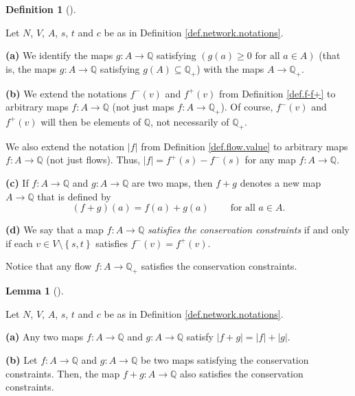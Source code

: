 \documentclass[numbers=enddot,12pt,final,onecolumn,notitlepage]{scrartcl}%
\theoremstyle{definition}
\newtheorem{lem}[theo]{Lemma}
\newenvironment{lemma}[1][]
{\begin{lem}[#1]\begin{leftbar}}
{\end{leftbar}\end{lem}}
\newtheorem{defi}[theo]{Definition}
\newenvironment{definition}[1][]
{\begin{defi}[#1]\begin{leftbar}}
{\end{leftbar}\end{defi}}
\begin{document}
\begin{definition}
Let $N$, $V$, $A$, $s$, $t$ and $c$ be as in Definition
\ref{def.network.notations}.

\textbf{(a)} We identify the maps $g:A\rightarrow\mathbb{Q}$ satisfying
$\left(  g\left(  a\right)  \geq0\text{ for all }a\in A\right)  $ (that is,
the maps $g:A\rightarrow\mathbb{Q}$ satisfying $g\left(  A\right)
\subseteq\mathbb{Q}_{+}$) with the maps $A\rightarrow\mathbb{Q}_{+}$.

\textbf{(b)} We extend the notations $f^{-}\left(  v\right)  $ and
$f^{+}\left(  v\right)  $ from Definition \ref{def.f-f+} to arbitrary maps
$f:A\rightarrow\mathbb{Q}$ (not just maps $f:A\rightarrow\mathbb{Q}_{+}$). Of
course, $f^{-}\left(  v\right)  $ and $f^{+}\left(  v\right)  $ will then be
elements of $\mathbb{Q}$, not necessarily of $\mathbb{Q}_{+}$.

We also extend the notation $\left\vert f\right\vert $ from Definition
\ref{def.flow.value} to arbitrary maps $f:A\rightarrow\mathbb{Q}$ (not just
flows). Thus, $\left\vert f\right\vert =f^{+}\left(  s\right)  -f^{-}\left(
s\right)  $ for any map $f:A\rightarrow\mathbb{Q}$.

\textbf{(c)} If $f:A\rightarrow\mathbb{Q}$ and $g:A\rightarrow\mathbb{Q}$ are
two maps, then $f+g$ denotes a new map $A\rightarrow\mathbb{Q}$ that is
defined by%
\[
\left(  f+g\right)  \left(  a\right)  =f\left(  a\right)  +g\left(  a\right)
\ \ \ \ \ \ \ \ \ \ \text{for all }a\in A.
\]


\textbf{(d)} We say that a map $f:A\rightarrow\mathbb{Q}$ \textit{satisfies
the conservation constraints} if and only if each $v\in V\setminus\left\{
s,t\right\}  $ satisfies $f^{-}\left(  v\right)  =f^{+}\left(  v\right)  $.
\end{definition}

Notice that any flow $f:A\rightarrow\mathbb{Q}_{+}$ satisfies the conservation constraints.

\begin{lemma}
\label{lem.5}Let $N$, $V$, $A$, $s$, $t$ and $c$ be as in Definition
\ref{def.network.notations}.

\textbf{(a)} Any two maps $f:A\rightarrow\mathbb{Q}$ and $g:A\rightarrow
\mathbb{Q}$ satisfy $\left\vert f+g\right\vert =\left\vert f\right\vert
+\left\vert g\right\vert $.

\textbf{(b)} Let $f:A\rightarrow\mathbb{Q}$ and $g:A\rightarrow\mathbb{Q}$ be
two maps satisfying the conservation constraints. Then, the map
$f+g:A\rightarrow\mathbb{Q}$ also satisfies the conservation constraints.
\end{lemma}
\end{document}
